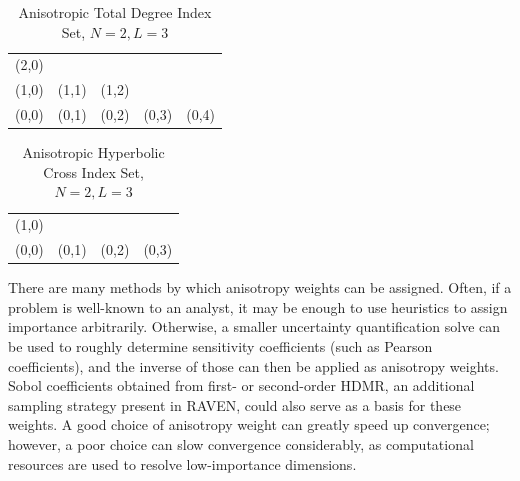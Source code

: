 \begin{table}[h]
  \centering
  \begin{tabular}{c c c c c}
    (2,0) &       &       &       & \\
    (1,0) & (1,1) & (1,2) &       & \\
    (0,0) & (0,1) & (0,2) & (0,3) & (0,4)
  \end{tabular}
  \caption{Anisotropic Total Degree Index Set, $N=2,L=3$}
  \label{tab:aniTD}
\end{table}

\begin{table}[h]
  \centering
  \begin{tabular}{c c c c}
    (1,0) &       &       &       \\
    (0,0) & (0,1) & (0,2) & (0,3)
  \end{tabular}
  \caption{Anisotropic Hyperbolic Cross Index Set, $N=2,L=3$}
  \label{tab:aniHC}
\end{table}

There are many methods by which anisotropy weights can be assigned.  Often, if a problem is well-known to an 
analyst, it may be enough to use heuristics to assign importance arbitrarily.  Otherwise, a smaller
uncertainty quantification solve can be used to roughly determine sensitivity coefficients (such as Pearson
coefficients), and the inverse of those can then be applied as anisotropy weights.  Sobol coefficients
obtained from first- or second-order HDMR, an additional sampling strategy present in RAVEN, could also serve as a basis for these weights.
A good choice of anisotropy weight can greatly speed up convergence; however, a
poor choice can slow convergence considerably, as computational resources are used to resolve low-importance
dimensions.

